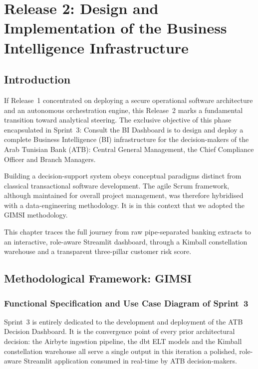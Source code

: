 \chapter{Release 2: Design and Implementation of the Business Intelligence Infrastructure}
\label{chap:release2}

\section{Introduction}
If Release~1 concentrated on deploying a secure operational software architecture
and an autonomous orchestration engine, this Release~2 marks a
fundamental transition toward analytical steering. The exclusive objective of
this phase encapsulated in Sprint~3: Consult the BI Dashboard
is to design and deploy a complete Business Intelligence (BI) infrastructure for
the decision-makers of the Arab Tunisian Bank (ATB): Central General Management,
the Chief Compliance Officer and Branch Managers.

Building a decision-support system obeys conceptual paradigms distinct from
classical transactional software development. The agile Scrum framework,
although maintained for overall project management, was therefore hybridised
with a data-engineering methodology. It is in this context that we adopted the
GIMSI methodology.

This chapter traces the full journey from raw pipe-separated banking extracts
to an interactive, role-aware Streamlit dashboard, through a Kimball
constellation warehouse and a transparent three-pillar customer risk score.

\section{Methodological Framework: GIMSI}
\label{sec:gimsi_framework}

\subsection{Functional Specification and Use Case Diagram of Sprint~3}
Sprint~3 is entirely dedicated to the development and deployment of the
ATB Decision Dashboard. It is the convergence point of every prior
architectural decision: the Airbyte ingestion pipeline, the dbt ELT models and
the Kimball constellation warehouse all serve a single output in this iteration a polished, role-aware Streamlit application consumed in real-time by ATB
decision-makers.


